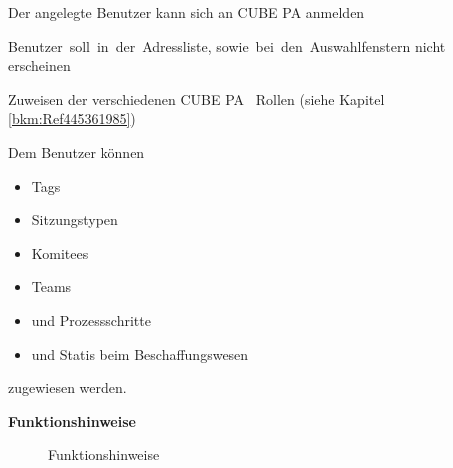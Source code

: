 \begin{small}
\begin{raggedright}

Der angelegte Benutzer kann sich an CUBE PA anmelden

\vspace{\baselineskip}

\mbox{Benutzer soll in der Adressliste,} 
\mbox{sowie bei den Auswahlfenstern}
nicht erscheinen

\vspace{\baselineskip}

Zuweisen der verschiedenen CUBE PA \
Rollen (siehe Kapitel \ref{bkm:Ref445361985})

\vspace{\baselineskip}
\vspace{\baselineskip}
\vspace{\baselineskip}

Dem Benutzer können

\vspace{\baselineskip}

\begin{itemize}
\item Tags
\vspace{\baselineskip}
\vspace{\baselineskip}
\item Sitzungstypen
\vspace{\baselineskip}
\item Komitees
\item Teams
\item und Prozessschritte
\item und Statis beim \newline Beschaffungswesen
\end{itemize}

\vspace{\baselineskip}

zugewiesen werden.

\end{raggedright}
\end{small}

\raggedright{}

\clearpage
\textbf{Funktionshinweise}

\begin{figure}[H]
\caption{Funktionshinweise}
\end{figure}

